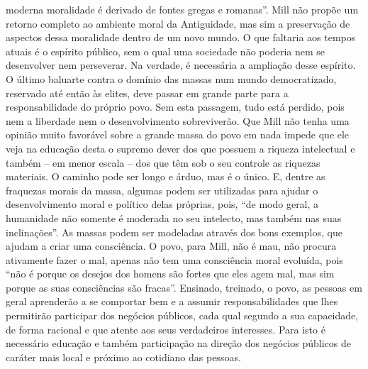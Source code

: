 moderna moralidade é derivado de fontes gregas e romanas''. Mill não
propõe um retorno completo ao ambiente moral da Antiguidade, mas
sim a preservação de aspectos dessa moralidade dentro de um novo mundo.
O que faltaria aos tempos atuais é o espírito público, sem o qual uma
sociedade não poderia nem se desenvolver nem perseverar. Na verdade, é
necessária a ampliação desse espírito. O último baluarte contra o
domínio das massas num mundo democratizado, reservado até então às
elites, deve passar em grande parte para a responsabilidade do próprio
povo. Sem esta passagem, tudo está perdido, pois nem a liberdade nem o
desenvolvimento sobreviverão. Que Mill não tenha uma opinião muito
favorável sobre a grande massa do povo em nada impede que ele veja na
educação desta o supremo dever dos que possuem a riqueza intelectual e
também – em menor escala – dos que têm sob o seu controle as riquezas
materiais. O caminho pode ser longo e árduo, mas é o único. E, dentre
as fraquezas morais da massa, algumas podem ser utilizadas para ajudar
o desenvolvimento moral e político delas próprias, pois, ``de
modo geral, a humanidade não somente é moderada no seu intelecto, mas
também nas suas inclinações''. As massas podem ser
modeladas através dos bons exemplos, que ajudam a criar uma
consciência. O povo, para Mill, não é mau, não procura ativamente fazer
o mal, apenas não tem uma consciência moral evoluída, pois ``não
é porque os desejos dos homens são fortes que eles agem mal, mas sim
porque as suas consciências são fracas''. Ensinado, treinado, o povo, as
pessoas em geral aprenderão a se comportar bem e a assumir
responsabilidades que lhes permitirão participar dos negócios públicos,
cada qual segundo a sua capacidade, de forma racional e que atente aos
seus verdadeiros interesses. Para isto é necessário educação e também
participação na direção dos negócios públicos de caráter mais local e
próximo ao cotidiano das pessoas.


